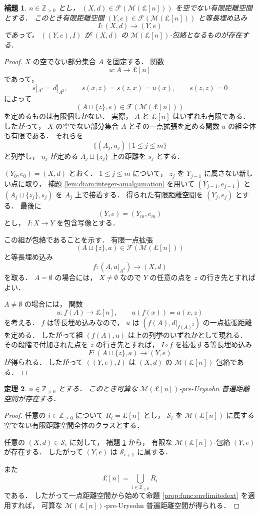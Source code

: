 \documentclass[leqno, 12pt]{jsarticle}
\newtheorem{thm}{定理}[section]
\newtheorem{lem}[thm]{補題}
\newcommand{\zz}{\mathbb{Z}}
\newcommand{\yozz}[1]{\zz_{\ge #1}}
\newcommand{\Met}[1]{\mathscr{M}(#1)}
\newcommand{\FinitePart}[1]{\mathscr{F}(#1)}
\newcommand{\FinMet}[1]{\FinitePart{\Met{#1}}}
\newcommand{\restr}[2]{#1|_{#2}}
\newcommand{\pospart}[1]{#1_{>0}}
\newcommand{\zzpos}{\pospart{\zz}}
\newcommand{\Rint}[1]{\mathsterling[#1]}
\begin{document}
\begin{lem}\label{lem:diam:finite-integer-envelope}
$n\in\zzpos$
とし，
$(X,d)\in\FinMet{\Rint{n}}$
を空でない有限距離空間とする．
このとき有限距離空間
$(Y,e)\in\FinMet{\Rint{n}}$
と等長埋め込み
\[
I\colon(X,d)\longrightarrow(Y,e)
\]
であって，
$((Y,e),I)$
が
$(X,d)$
の
$\Met{\Rint{n}}$-包絡となるものが存在する．
\end{lem}
\begin{proof}
$X$
の空でない部分集合
$A$
を固定する．
関数
\[
u\colon A\longrightarrow\Rint{n}
\]
であって，
\[
\restr{s}{A^2}=\restr{d}{A^2},
\qquad
s(x,z)=s(z,x)=u(x),
\qquad
s(z,z)=0
\]
によって
\[
(A\sqcup\{z\},s)\in\FinMet{\Rint{n}}
\]
を定めるものは有限個しかない．
実際，
$A$
と
$\Rint{n}$
はいずれも有限である．
したがって，
$X$
の空でない部分集合
$A$
とその一点拡張を定める関数
$u$
の組全体も有限である．
それらを
\[
\{(A_j,u_j)\mid
1\le j\le m\}
\]
と列挙し，
$u_j$
が定める
$A_j\sqcup\{z_j\}$
上の距離を
$s_j$
とする．

$(Y_0,e_0)=(X,d)$
とおく．
$1\le j\le m$
について，
$z_j$
を
$Y_{j-1}$
に属さない新しい点に取り，
補題
\ref{lem:diam:integer-amalgamation}
を用いて
$(Y_{j-1},e_{j-1})$
と
$(A_j\sqcup\{z_j\},s_j)$
を
$A_j$
上で接着する．
得られた有限距離空間を
$(Y_j,e_j)$
とする．
最後に
\[
(Y,e)=(Y_m,e_m)
\]
とし，
$I\colon X\to Y$
を包含写像とする．

この組が包絡であることを示す．
有限一点拡張
\[
(A\sqcup\{z\},a)\in\FinMet{\Rint{n}}
\]
と等長埋め込み
\[
f\colon(A,\restr{a}{A^2})\longrightarrow(X,d)
\]
を取る．
$A=\emptyset$
の場合には，
$X\neq\emptyset$
なので
$Y$
の任意の点を
$z$
の行き先とすればよい．

$A\neq\emptyset$
の場合には，
関数
\[
u\colon f(A)\longrightarrow\Rint{n},
\qquad
u(f(x))=a(x,z)
\]
を考える．
$f$
は等長埋め込みなので，
$u$
は
$(f(A),\restr{d}{f(A)^2})$
の一点拡張距離を定める．
したがって組
$(f(A),u)$
は上の列挙のいずれかとして現れる．
その段階で付加された点を
$z$
の行き先とすれば，
$I\circ f$
を拡張する等長埋め込み
\[
F\colon
(A\sqcup\{z\},a)
\longrightarrow
(Y,e)
\]
が得られる．
したがって
$((Y,e),I)$
は
$(X,d)$
の
$\Met{\Rint{n}}$-包絡である．
\end{proof}

\begin{thm}\label{thm:diam:finite-integer-existence}
$n\in\zzpos$
とする．
このとき可算な
$\Met{\Rint{n}}$-pre-Urysohn
普遍距離空間が存在する．
\end{thm}
\begin{proof}
任意の
$i\in\yozz{0}$
について
$R_i=\Rint{n}$
とし，
$\mathscr S_{i}$
を
$\Met{\Rint{n}}$
に属する空でない有限距離空間全体のクラスとする．

任意の
$(X,d)\in\mathscr S_{i}$
に対して，
補題
\ref{lem:diam:finite-integer-envelope}
から，
有限な
$\Met{\Rint{n}}$-包絡
$(Y,e)$
が存在する．
したがって
$(Y,e)$
は
$\mathscr S_{i+1}$
に属する．

また
\[
\Rint{n}
=\bigcup_{i\in\yozz{0}}R_i
\]
である．
したがって一点距離空間から始めて命題
\ref{prop:func:envlimitedext}
を適用すれば，
可算な
$\Met{\Rint{n}}$-pre-Urysohn
普遍距離空間が得られる．
\end{proof}
\end{document}
